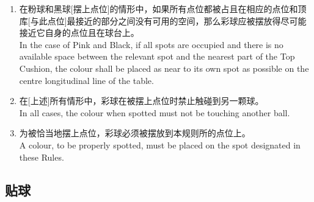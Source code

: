 \begin{enumerate}[label=(\alph*)]
    \item 在粉球和黑球[摆上点位]的情形中，如果所有点位都被占且在相应的点位和顶库[与此点位]最接近的部分之间没有可用的空间，那么彩球应被摆放得尽可能接近它自身的点位且在球台\longitudinalline{}上。\\
    In the case of Pink and Black, if all spots are occupied and there is no available space between the relevant spot and the nearest part of the Top Cushion, the colour shall be placed as near to its own spot as possible on the centre longitudinal line of the table.
    \item 在[上述]所有情形中，彩球在被摆上点位时禁止触碰到另一颗球。\\
    In all cases, the colour when spotted must not be touching another ball.
    \item 为被恰当地摆上点位，彩球必须被摆放到本规则所\designate{}的点位上。\\
    A colour, to be properly spotted, must be placed on the spot designated in these Rules.
\end{enumerate}

\subsection{贴球}

